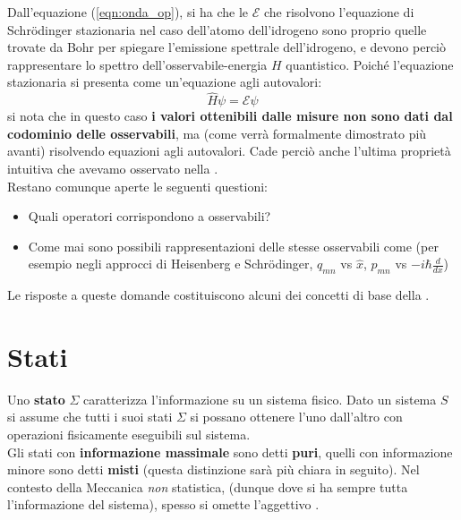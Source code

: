 \documentclass[FisicaTeorica.tex]{subfiles}
\begin{document}
Dall'equazione (\ref{eqn:onda_op}), si ha che le $\mathcal{E}$ che risolvono l'equazione di Schrödinger stazionaria nel caso dell'atomo dell'idrogeno sono proprio quelle trovate da Bohr per spiegare l'emissione spettrale dell'idrogeno, e devono perciò rappresentare lo spettro dell'osservabile-energia $H$ quantistico. Poiché l'equazione stazionaria si presenta come un'equazione agli autovalori:
\[
\hat{H}\psi = \mathcal{E}\psi
\]
si nota che in questo caso \textbf{i valori ottenibili dalle misure non sono dati dal codominio delle osservabili}, ma (come verrà formalmente dimostrato più avanti) risolvendo equazioni agli autovalori. Cade perciò anche l'ultima proprietà intuitiva che avevamo osservato nella \MC.\\

Restano comunque aperte le seguenti questioni:
\begin{itemize}
    \item Quali operatori corrispondono a osservabili?
    \item Come mai sono possibili rappresentazioni delle stesse osservabili come  (per esempio negli approcci di Heisenberg e Schrödinger, $q_{mn}$ vs $\hat{x}$, $p_{mn}$ vs $-i\hbar \frac{d}{dx}$)
\end{itemize}

Le risposte a queste domande costituiscono alcuni dei concetti di base della \MQ.

\section{Stati}
Uno \textbf{stato} $\Sigma$ caratterizza l'informazione  su un sistema fisico. Dato un sistema $S$ si assume che tutti i suoi stati $\Sigma$ si possano ottenere l'uno dall'altro con operazioni fisicamente eseguibili sul sistema.\\
Gli stati con \textbf{informazione massimale} sono detti \textbf{puri}, quelli con informazione minore sono detti \textbf{misti} (questa distinzione sarà più chiara in seguito). Nel contesto della Meccanica \emph{non} statistica, (dunque dove si ha sempre tutta l'informazione del sistema), spesso si omette l'aggettivo .
\end{document}
